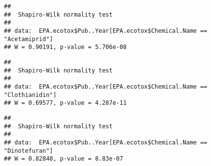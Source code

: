 \documentclass[]{article}
\newenvironment{Shaded}{\begin{snugshade}}{\end{snugshade}}
\newcommand{\KeywordTok}[1]{\textcolor[rgb]{0.13,0.29,0.53}{\textbf{#1}}}
\newcommand{\StringTok}[1]{\textcolor[rgb]{0.31,0.60,0.02}{#1}}
\newcommand{\CommentTok}[1]{\textcolor[rgb]{0.56,0.35,0.01}{\textit{#1}}}
\newcommand{\OperatorTok}[1]{\textcolor[rgb]{0.81,0.36,0.00}{\textbf{#1}}}
\newcommand{\NormalTok}[1]{#1}
\begin{document}
\begin{Shaded}
\end{Shaded}

\begin{verbatim}
## 
##  Shapiro-Wilk normality test
## 
## data:  EPA.ecotox$Pub..Year[EPA.ecotox$Chemical.Name == "Acetamiprid"]
## W = 0.90191, p-value = 5.706e-08
\end{verbatim}

\begin{Shaded}
\end{Shaded}

\begin{verbatim}
## 
##  Shapiro-Wilk normality test
## 
## data:  EPA.ecotox$Pub..Year[EPA.ecotox$Chemical.Name == "Clothianidin"]
## W = 0.69577, p-value = 4.287e-11
\end{verbatim}

\begin{Shaded}
\end{Shaded}

\begin{verbatim}
## 
##  Shapiro-Wilk normality test
## 
## data:  EPA.ecotox$Pub..Year[EPA.ecotox$Chemical.Name == "Dinotefuran"]
## W = 0.82848, p-value = 8.83e-07
\end{verbatim}

\begin{Shaded}
\end{Shaded}
\end{document}
